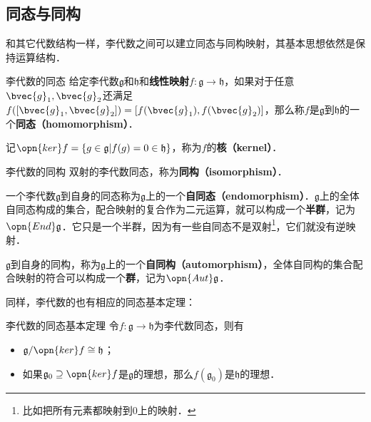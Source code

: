 


\subsection{同态与同构}

和其它代数结构一样，李代数之间可以建立同态与同构映射，其基本思想依然是保持运算结构．

\begin{definition}{李代数的同态}
给定李代数$\mathfrak{g}$和$\mathfrak{h}$和\textbf{线性映射}$f:\mathfrak{g}\to\mathfrak{h}$，如果对于任意$\bvec{g}_1, \bvec{g}_2$还满足$f([\bvec{g}_1, \bvec{g}_2])=[f(\bvec{g}_1), f(\bvec{g}_2)]$，那么称$f$是$\mathfrak{g}$到$\mathfrak{h}$的一个\textbf{同态（homomorphism）}．

记$\opn{ker}f =\{g\in\mathfrak{g}|f(g)=0\in\mathfrak{h}\}$，称为$f$的\textbf{核（kernel）}．
\end{definition}

\begin{definition}{李代数的同构}
双射的李代数同态，称为\textbf{同构（isomorphism）}．
\end{definition}

一个李代数$\mathfrak{g}$到自身的同态称为$\mathfrak{g}$上的一个\textbf{自同态（endomorphism）}．$\mathfrak{g}$上的全体自同态构成的集合，配合映射的复合作为二元运算，就可以构成一个\textbf{半群}，记为$\opn{End}\mathfrak{g}$．它只是一个半群，因为有一些自同态不是双射\footnote{比如把所有元素都映射到$0$上的映射．}，它们就没有逆映射．

$\mathfrak{g}$到自身的同构，称为$\mathfrak{g}$上的一个\textbf{自同构（automorphism）}，全体自同构的集合配合映射的符合可以构成一个\textbf{群}，记为$\opn{Aut}\mathfrak{g}$．

同样，李代数的也有相应的同态基本定理：

\begin{definition}{李代数的同态基本定理}
令$f:\mathfrak{g}\to \mathfrak{h}$为李代数同态，则有
\begin{itemize}
\item $\mathfrak{g}/\opn{ker} f\cong \mathfrak{h}$；
\item 如果$\mathfrak{g}_0\supseteq \opn{ker}f$是$\mathfrak{g}$的理想，那么$f(\mathfrak{g}_0)$是$\mathfrak{h}$的理想．
\end{itemize}
\end{definition}


